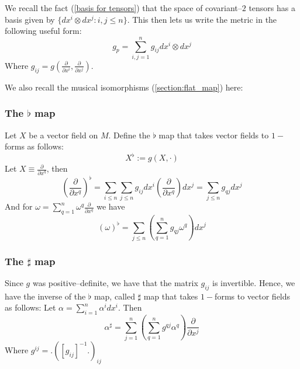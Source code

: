 
We recall the fact (\ref{basis for tensors}) that the space of covariant--$2$ tensors has a basis given by $\{dx^i\otimes dx^j: i,j\leq n\}$. This then lets us write the metric in the following useful form: 
\begin{equation}
    g_p=\sum_{i,j=1}^n g_{ij}dx^i\otimes dx^j
\end{equation}
Where $g_{ij}=g(\frac{\partial}{\partial x^i},\frac{\partial}{\partial x^j})$.

We also recall the musical isomorphisms (\ref{section:flat_map}) here:

\subsubsection{The $\flat$ map}
Let $X$ be a vector field on $M$. Define the $\flat$ map that takes vector fields to $1-$forms as follows: $$X^{\flat}:=g(X,\cdot) $$
Let $X\equiv \frac{\partial}{\partial x^q}$, then \begin{equation}(\frac{\partial}{\partial x^q})^{\flat}=\sum_{i\leq n}\sum_{j\leq n} g_{ij} dx^i(\frac{\partial}{\partial x^q})dx^j =\sum_{j\leq n} g_{qj} dx^j\end{equation}
And for $\omega=\sum_{q=1}^n \omega^q \frac{\partial}{\partial x^q}$ we have \begin{equation}
    (\omega)^{\flat}=\sum_{j\leq n} (\sum_{q=1}^n g_{qj} \omega^q )dx^j
\end{equation}

\subsubsection{The $\sharp$ map}
Since $g$ was positive--definite, we have that the matrix $g_{ij}$ is invertible. Hence, we have the inverse of the $\flat$ map, called $\sharp$ map that takes $1-$forms to vector fields as follows: Let $\alpha=\sum_{i=1}^n \alpha^i dx^i$. Then \begin{equation}
    \alpha^{\sharp}=\sum_{j=1}^n(\sum_{q=1}^n g^{qj}\alpha^q)\frac{\partial}{\partial x^j}
\end{equation}
Where $g^{ij}=\bigg.([g_{ij}]^{-1}\bigg.)_{ij}$

